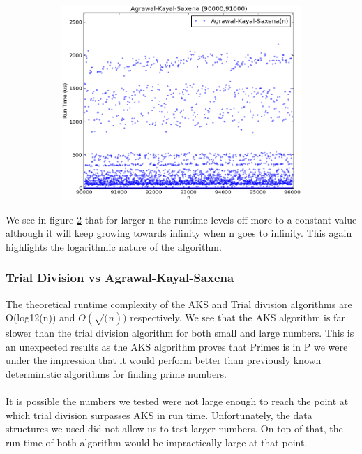 \documentclass[compressed,final,notitlepage,narroweqnarray,inline,twoside,]{ieee}
\begin{document}
\begin{figure}
        \centering
        \begin{subfigure}[b]{0.5\textwidth}
                \includegraphics[width=\textwidth]{../images/AKS_large}
                \label{fig:gull}
        \end{subfigure}
        \vspace{-30pt}\caption{}\label{fig:aks_runtime_large}
\end{figure}
We see in figure \ref{fig:aks_runtime_large}  that for larger n the runtime levels off more to a constant value although it will keep growing towards infinity when n goes to infinity. This again highlights the logarithmic nature of the algorithm. 
\subsubsection{Trial Division vs Agrawal-Kayal-Saxena}
The theoretical runtime complexity of the AKS and Trial division algorithms are O(log12(n)) and $O(\sqrt(n))$ respectively. We see that the AKS algorithm is far slower than the trial division algorithm for both small and large numbers. This is an unexpected results as the AKS algorithm proves that Primes is in P we were under the impression that it would perform better than previously known deterministic algorithms for finding prime numbers.\\\\ It is possible the numbers we tested were not large enough to reach the point at which trial division surpasses AKS in run time. Unfortunately, the data structures we used did not allow us to test larger numbers. On top of that, the run time of both algorithm would be impractically large at that point.
\end{document}
